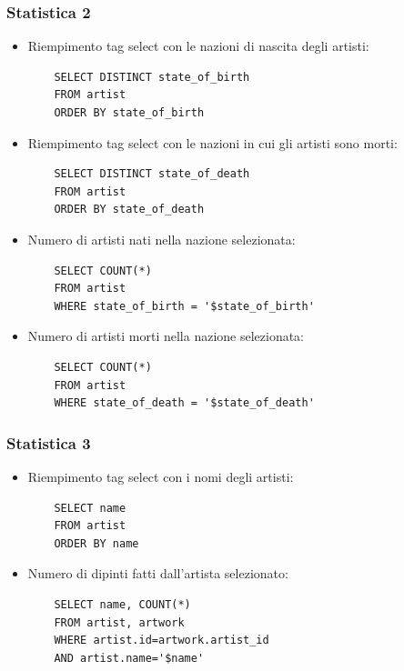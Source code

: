 \documentclass{ol-softwaremanual}
\begin{document}
\subsubsection{Statistica 2}
\begin{itemize}
    \item Riempimento tag select con le nazioni di nascita degli artisti:
    \begin{verbatim}
    SELECT DISTINCT state_of_birth 
    FROM artist
    ORDER BY state_of_birth
    \end{verbatim}
    \item Riempimento tag select con le nazioni in cui gli artisti sono morti:
    \begin{verbatim}
    SELECT DISTINCT state_of_death
    FROM artist
    ORDER BY state_of_death
    \end{verbatim}
    \item Numero di artisti nati nella nazione selezionata:
    \begin{verbatim}
    SELECT COUNT(*)
    FROM artist 
    WHERE state_of_birth = '$state_of_birth'
    \end{verbatim}
    \item Numero di artisti morti nella nazione selezionata:
    \begin{verbatim}
    SELECT COUNT(*)
    FROM artist 
    WHERE state_of_death = '$state_of_death'
    \end{verbatim}
\end{itemize}
\subsubsection{Statistica 3}
\begin{itemize}
    \item Riempimento tag select con i nomi degli artisti:
    \begin{verbatim}
    SELECT name
    FROM artist
    ORDER BY name
    \end{verbatim}
    \newpage
    \item Numero di dipinti fatti dall'artista selezionato:
    \begin{verbatim}
    SELECT name, COUNT(*)
    FROM artist, artwork 
    WHERE artist.id=artwork.artist_id
    AND artist.name='$name'
    \end{verbatim}
\end{itemize}
\end{document}
